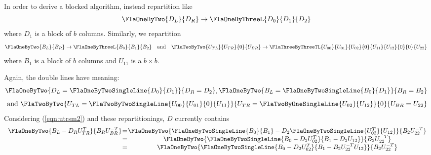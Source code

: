 In order to derive a blocked algorithm, instead repartition like
\[
  \FlaOneByTwo{ D_{L} }
              { D_{R} } \rightarrow
  \FlaOneByThreeL{ D_{0} }
                 { D_{1} }
                 { D_{2} }
\]
where
$ D_{1} $ is a block of $ b $ columns.
Similarly, we repartition 
\[ 
  \FlaOneByTwo{ B_{L} }
              { B_{R} } \rightarrow
  \FlaOneByThreeL{ B_{0} }
                 { B_{1} }
                 { B_{2} }
\quad \mbox{and} \quad
      \FlaTwoByTwo{ U_{TL} }{ U_{TR} }
                  {   0    }{ U_{BR} } \rightarrow
      \FlaThreeByThreeTL{ U_{00} } { U_{01} } { U_{02} }
                        {   0    } { U_{11} } { U_{12} }
                        {   0    } {    0   } { U_{22} }  
\]
where $ B_{1} $ is a block of $ b $ columns and 
$ U_{11} $ is a $ b \times b $.

Again, the double lines have meaning:
\begin{equation}
\label{eqn:teaml_ltrmmB:meaning}
\FlaOneByTwo  { D_L = \FlaOneByTwoSingleLine{ D_0 }
                                            { D_1 } }
              { D_R = D_2 },
%
\FlaOneByTwo  { B_L = \FlaOneByTwoSingleLine{ B_0 }
                                            { D_1 } }
              { B_R = B_2 }
\end{equation}
\[
\mbox{ and }
%
\FlaTwoByTwo  
              { U_{TL} = \FlaTwoByTwoSingleLine{ U_{00} } { U_{01} }
                                               {   0    } { U_{11} } }
              { U_{TR} = \FlaTwoByOneSingleLine{ U_{02} } 
                                               { U_{12} } }
	      { 0 }
              { U_{BR} = U_{22} } 
\]
Considering (\ref{eqn:utrsm2}) and these repartitionings, 
$ D $ currently contains
\begin{eqnarray*}
\begin{array}{c @{\hspace{1pt}} c @{\hspace{1pt}} c @{\hspace{1pt}} c @{\hspace{1pt}} c} 
\FlaOneByTwo{ B_{L} - D_{R} U_{TR}^{T} }
            { B_{R} U_{BR}^{-T}        }
&=& 
\FlaOneByTwo{ \FlaOneByTwoSingleLine{ B_0 }
                                    { B_1 } -
	      D_2
              \FlaOneByTwoSingleLine{ U_{02}^{T} } 
                                    { U_{12}     } }
             { B_{2}U_{22}^{-T} } \\
&=&
\FlaOneByTwo{ \FlaOneByTwoSingleLine{ B_0 - D_{2}U_{02}^{T} }
                                    { B_1 - D_{2}U_{12}     } }
	    { B_{2}U_{22}^{-T} } \\
&=&
\FlaOneByTwo{ \FlaOneByTwoSingleLine{ B_0 - D_{2}U_{02}^{T}         }
                                    { B_1 - B_{2}U_{22}^{-T}U_{12}  } }
	    { B_{2}U_{22}^{-T} } \\    
\end{array}
\end{eqnarray*}

